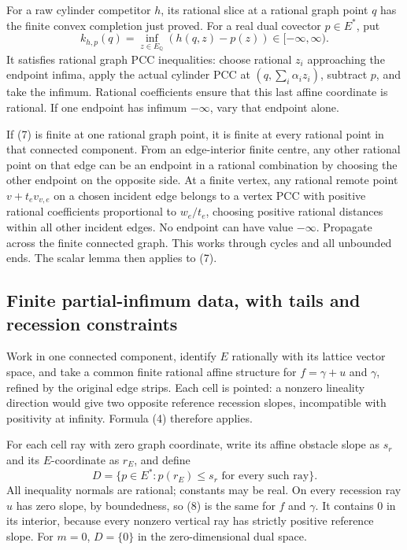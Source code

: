 \documentclass[
  11pt,
]{article}
\begin{document}
For a raw cylinder competitor \(h\), its rational slice at a rational
graph point \(q\) has the finite convex completion just proved. For a
real dual covector \(p\in E^*\), put \[
 k_{h,p}(q)=\inf_{z\in E_{\mathbb{Q}}}(h(q,z)-p(z))\in[-\infty,\infty).             \tag{7}
\] It satisfies rational graph PCC inequalities: choose rational \(z_i\)
approaching the endpoint infima, apply the actual cylinder PCC at
\((q,\sum_i\alpha_i z_i)\), subtract \(p\), and take the infimum.
Rational coefficients ensure that this last affine coordinate is
rational. If one endpoint has infimum \(-\infty\), vary that endpoint
alone.

If (7) is finite at one rational graph point, it is finite at every
rational point in that connected component. From an edge-interior finite
centre, any other rational point on that edge can be an endpoint in a
rational combination by choosing the other endpoint on the opposite
side. At a finite vertex, any rational remote point \(v+t_ev_{v,e}\) on
a chosen incident edge belongs to a vertex PCC with positive rational
coefficients proportional to \(w_e/t_e\), choosing positive rational
distances within all other incident edges. No endpoint can have value
\(-\infty\). Propagate across the finite connected graph. This works
through cycles and all unbounded ends. The scalar lemma then applies to
(7).

\subsection{Finite partial-infimum data, with tails and recession
constraints}\label{finite-partial-infimum-data-with-tails-and-recession-constraints}

Work in one connected component, identify \(E\) rationally with its
lattice vector space, and take a common finite rational affine structure
for \(f=\gamma+u\) and \(\gamma\), refined by the original edge strips.
Each cell is pointed: a nonzero lineality direction would give two
opposite reference recession slopes, incompatible with positivity at
infinity. Formula (4) therefore applies.

For each cell ray with zero graph coordinate, write its affine obstacle
slope as \(s_r\) and its \(E\)-coordinate as \(r_E\), and define \[
 D=\{p\in E^*:p(r_E)\leq s_r\text{ for every such ray}\}.                    \tag{8}
\] All inequality normals are rational; constants may be real. On every
recession ray \(u\) has zero slope, by boundedness, so (8) is the same
for \(f\) and \(\gamma\). It contains 0 in its interior, because every
nonzero vertical ray has strictly positive reference slope. For \(m=0\),
\(D=\{0\}\) in the zero-dimensional dual space.
\end{document}
